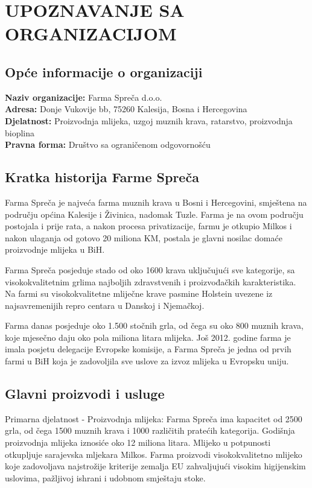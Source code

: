 \documentclass{article}
\begin{document}
\newpage
    \section{UPOZNAVANJE SA ORGANIZACIJOM} %
\subsection{Opće informacije o organizaciji}
\textbf{Naziv organizacije:} Farma Spreča d.o.o.\\
\textbf{Adresa:} Donje Vukovije bb, 75260 Kalesija, Bosna i Hercegovina\\
\textbf{Djelatnost:} Proizvodnja mlijeka, uzgoj muznih krava, ratarstvo, proizvodnja bioplina\\
\textbf{Pravna forma:} Društvo sa ograničenom odgovornošću\\

\subsection{Kratka historija Farme Spreča}
Farma Spreča je najveća farma muznih krava u Bosni i Hercegovini, smještena na području općina Kalesije i Živinica, nadomak Tuzle. Farma je na ovom području postojala i prije rata, a nakon procesa privatizacije, farmu je otkupio Milkos i nakon ulaganja od gotovo 20 miliona KM, postala je glavni nosilac domaće proizvodnje mlijeka u BiH.

Farma Spreča posjeduje stado od oko 1600 krava uključujući sve kategorije, sa visokokvalitetnim grlima najboljih zdravstvenih i proizvođačkih karakteristika. Na farmi su visokokvalitetne mliječne krave pasmine Holstein uvezene iz najsavremenijih repro centara u Danskoj i Njemačkoj.

Farma danas posjeduje oko 1.500 stočnih grla, od čega su oko 800 muznih krava, koje mjesečno daju oko pola miliona litara mlijeka. Još 2012. godine farma je imala posjetu delegacije Evropske komisije, a Farma Spreča je jedna od prvih farmi u BiH koja je zadovoljila sve uslove za izvoz mlijeka u Evropsku uniju.

\subsection{Glavni proizvodi i usluge}
Primarna djelatnost - Proizvodnja mlijeka:
Farma Spreča ima kapacitet od 2500 grla, od čega 1500 muznih krava i 1000 različitih pratećih kategorija. Godišnja proizvodnja mlijeka iznosiće oko 12 miliona litara. Mlijeko u potpunosti otkupljuje sarajevska mljekara Milkos. Farma proizvodi visokokvalitetno mlijeko koje zadovoljava najstrožije kriterije zemalja EU zahvaljujući visokim higijenskim uslovima, pažljivoj ishrani i udobnom smještaju stoke.
\end{document}
